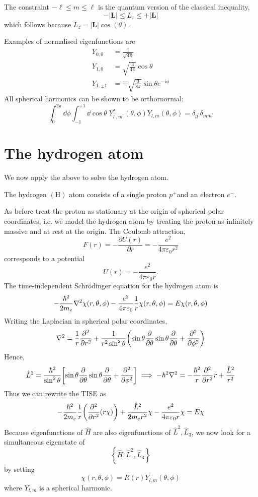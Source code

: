 \documentclass[a4paper]{article}
\begin{document}
The constraint $-\ell \leq m \leq \ell$ is the quantum version of the classical inequality,
\[
-|\mathbf{L}| \leq L_z \leq+|\mathbf{L}|
\]
which follows because $L_z=|\mathbf{L}| \cos (\theta)$.

Examples of normalised eigenfunctions are
\begin{align*}
	Y_{0,0}     & = \frac{1}{\sqrt{4 \pi}}                             \\
	Y_{1,0}     & = \sqrt{\frac{3}{4 \pi}} \cos \theta                 \\
	Y_{1,\pm 1} & = \mp \sqrt{\frac{3}{8 \pi}} \sin \theta e^{-i \phi}
\end{align*}
All spherical harmonics can be shown to be orthornormal:
\[
	\int_0^{2 \pi} \dd \phi \int_{-1}^{+1} \dd \cos \theta\; Y_{l^{\prime}, m^{\prime}}^*(\theta, \phi) Y_{l, m}(\theta, \phi)=\delta_{l l^{\prime}} \delta_{m m^{\prime}}
\]

\section{The hydrogen atom}
We now apply the above to solve the hydrogen atom. 
\begin{definition}
	The hydrogen $(\mathrm{H})$ atom consists of a single proton $p^{+}$and an electron $e^{-}$.
\end{definition}

As before treat the proton as stationary at the origin of spherical polar coordinates, i.e. we model the hydrogen atom by treating the proton as infinitely massive and at rest at the origin. The Coulomb attraction,
\[
F(r)=-\frac{\partial U(r)}{\partial r}=-\frac{e^2}{4 \pi \varepsilon_0 r^2}
\]
corresponds to a potential
\[
U(r)=-\frac{e^2}{4 \pi \varepsilon_0 r}.
\]
The time-independent Schr\"odinger equation for the hydrogen atom is
\[
	-\frac{\hbar^2}{2m_e} \laplacian{\chi(r, \theta, \phi)} - \frac{e^2}{4 \pi \varepsilon_0} \frac{1}{r} \chi(r, \theta, \phi) = E \chi(r,\theta, \phi)
\]
Writing the Laplacian in spherical polar coordinates,
\[
	\laplacian{} = \frac{1}{r} \pdv[2]{r} + \frac{1}{r^2 \sin^2 \theta} \qty( \sin \theta \pdv{\theta} \sin \theta \pdv{\theta} + \pdv[2]{\phi} )
\]
Hence,
\[
	\hat L^2 = \frac{\hbar^2}{\sin^2\theta} \qty[ \sin \theta \pdv{\theta} \sin \theta \pdv{\theta} + \pdv[2]{\phi} ] \implies -\hbar^2 \laplacian{} = -\frac{\hbar^2}{r} \pdv[2]{r} r + \frac{\hat L^2}{r^2}
\]
Thus we can rewrite the TISE as
\[
	-\frac{\hbar^2}{2m_e} \frac{1}{r} \qty( \pdv[2]{r} \qty(r \chi) ) + \frac{\hat L^2}{2 m_e r^2} \chi - \frac{e^2}{4 \pi \varepsilon_0 r} \chi = E \chi
\]
Because eigenfunctions of $ \hat H $ are also eigenfunctions of $ \hat L^2, \hat L_3 $, we now look for a simultaneous eigenstate of
\[
\left\{\hat{H}, \hat{L}^2, \hat{L}_3\right\}
\]
by setting
\[
\chi(r, \theta, \phi)=R(r) Y_{l, m}(\theta, \phi)
\]
where $Y_{l, m}$ is a spherical harmonic.
\end{document}
